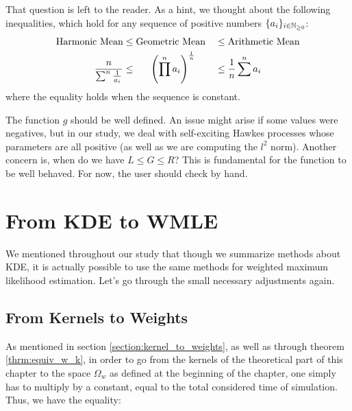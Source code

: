 \documentclass[11pt]{book}
\newcommand{\sequence}[1]{\{ #1 \}_{ i \in \N} }
\begin{document}


That question is left to the reader. As a hint, we thought about the following inequalities, which hold for any sequence of positive numbers $\sequence{a_i}$:
\begin{alignat}{2}
\text{Harmonic Mean} 
&\leq \text{Geometric Mean} 
&& \leq \text{Arithmetic Mean} \notag \\
\frac n {\sum^n \frac 1 {a_i} } 
& \leq \hspace{0.55 cm} \left ( \prod^n a_i \right ) ^{ \frac 1 n } 
&& \leq \frac 1 n \sum^n a_i \notag
\end{alignat}
where the equality holds when the sequence is constant.

The function $g$ should be well defined. An issue might arise if some values were negatives, but in our study, we deal with self-exciting Hawkes processes whose parameters are all positive (as well as we are computing the $l^2$ norm). Another concern is, when do we have $L \leq G \leq R$? This is fundamental for the function to be well behaved. For now, the user should check by hand.





















\section{From KDE to WMLE}

We mentioned throughout our study that though we summarize methods about KDE, it is actually possible to use the same methods for weighted maximum likelihood estimation. Let's go through the small necessary adjustments again.

\subsection{From Kernels to Weights}
As mentioned in section \ref{section:kernel_to_weights}, as well as through theorem \ref{thrm:equiv_w_k}, in order to go from the kernels of the theoretical part of this chapter to the space $\Omega_w$ as defined at the beginning of the chapter, one simply has to multiply by a constant, equal to the total considered time of simulation. Thus, we have the equality:
\end{document}
